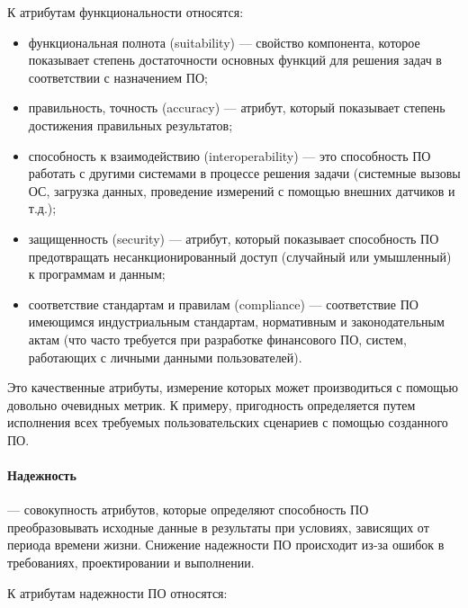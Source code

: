 \documentclass{../../text-style}
\begin{document}
К атрибутам функциональности относятся:

\begin{itemize}
    \item функциональная полнота (suitability) --- свойство компонента, которое показывает степень достаточности основных функций для решения задач в соответствии с назначением ПО;
    \item правильность, точность (accuracy) --- атрибут, который показывает степень достижения правильных результатов;
    \item способность к взаимодействию (interoperability) --- это способность ПО работать с другими системами в процессе решения задачи (системные вызовы ОС, загрузка данных, проведение измерений с помощью внешних датчиков и т.д.);
    \item защищенность (security) --- атрибут, который показывает способность ПО предотвращать несанкционированный доступ (случайный или умышленный) к программам и данным;
    \item соответствие стандартам и правилам (compliance) --- соответствие ПО имеющимся индустриальным стандартам, нормативным и законодательным актам (что часто требуется при разработке финансового ПО, систем, работающих с личными данными пользователей).
\end{itemize}

Это качественные атрибуты, измерение которых может производиться с помощью довольно очевидных метрик. К примеру, пригодность определяется путем исполнения всех требуемых пользовательских сценариев с помощью созданного ПО.

\paragraph{Надежность} --- совокупность атрибутов, которые определяют способность ПО преобразовывать исходные данные в результаты при условиях, зависящих от периода времени жизни. Снижение надежности ПО происходит из-за ошибок в требованиях, проектировании и выполнении.

К атрибутам надежности ПО относятся:
\end{document}
